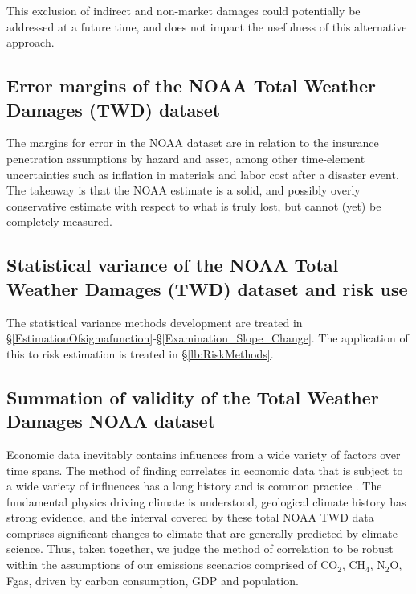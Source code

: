 \documentclass{article}
\begin{document}
This exclusion of indirect and non-market damages could potentially be addressed at a future time, and does not impact the usefulness of this alternative approach. 

\subsection{Error margins of the NOAA Total Weather Damages (TWD) dataset}
The margins for error in the NOAA dataset are in relation to the insurance penetration assumptions by hazard and asset, among other time-element uncertainties such as inflation in materials and labor cost after a disaster event. The takeaway is that the NOAA estimate is a solid, and possibly overly conservative estimate with respect to what is truly lost, but cannot (yet) be completely measured.

\subsection{Statistical variance of the NOAA Total Weather Damages (TWD) dataset and risk use} 
The statistical variance methods development are treated in \S\ref{EstimationOfsigmafunction}-\S\ref{Examination_Slope_Change}. The application of this to risk estimation is treated in \S\ref{lb:RiskMethods}.

\subsection{Summation of validity of the Total Weather Damages NOAA dataset}
\label{lb:NOAAvaliditySummation}
Economic data inevitably contains influences from a wide variety of factors over time spans. The method of finding correlates in economic data that is subject to a wide variety of influences has a long history and is common practice \cite{Lee2001PopulationInequalityHomicide,Burke2009WarmingIncreasesWarAfrica,Burke2015GlobalNonlinearEffectOfTemp,Mirza2021GlobalInequalityRemote}. The fundamental physics driving climate is understood, geological climate history has strong evidence, and the interval covered by these total NOAA TWD data comprises significant changes to climate that are generally predicted by climate science.  Thus, taken together, we judge the method of correlation to be robust within the assumptions of our emissions scenarios comprised of CO$_2$, CH$_4$, N$_2$O, Fgas, driven by carbon consumption, GDP and population. 
\end{document}
